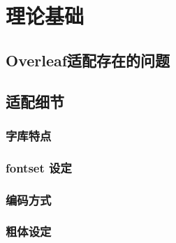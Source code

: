 \chapter{理论基础}
\label{chap:related}

\section{Overleaf适配存在的问题}
\label{sec:overleaf-problem}

\section{适配细节}
\label{sec:overleaf-detail}

\subsection{\CTeX{}字库特点}
\label{sec:ctex-font}

\subsection{fontset 设定}
\label{sec:overleaf-fontset}

\subsection{编码方式}
\label{sec:overleaf-encoding}

\subsection{粗体设定}
